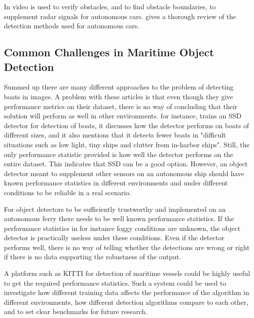 \vspace{3mm}

\noindent
In \citep{Wedel2007} video is used to verify obstacles, and to find obstacle boundaries, to supplement radar signals for autonomous cars. \citep{Sun2006} gives a thorough review of the detection methods used for autonomous cars. 


\subsection{Common Challenges in Maritime Object Detection}
Summed up there are many different approaches to the problem of detecting boats in images. A problem with these articles is that even though they give performance metrics on their dataset, there is no way of concluding that their solution will perform as well in other environments. \citep{SSD_detection2018} for instance, trains an SSD detector for detection of boats, it discusses how the detector performs on boats of different sizes, and it also mentions that it detects fewer boats in "difficult situations such as low light, tiny ships and clutter from in-harbor ships". Still, the only performance statistic provided is how well the detector performs on the entire dataset. This indicates that SSD can be a good option. However, an object detector meant to supplement other sensors on an autonomous ship should have known performance statistics in different environments and under different conditions to be reliable in a real scenario. 

\vspace{3mm}

For object detectors to be sufficiently trustworthy and implemented on an autonomous ferry there needs to be well known performance statistics. If the performance statistics in for instance foggy conditions are unknown, the object detector is practically useless under these conditions. Even if the detector performs well, there is no way of telling whether the detections are wrong or right if there is no data supporting the robustness of the output.

\vspace{3mm}

A platform such as KITTI \citep{KITTI} for detection of maritime vessels could be highly useful to get the required performance statistics. Such a system could be used to investigate how different training data affects the performance of the algorithm in different environments, how different detection algorithms compare to each other, and to set clear benchmarks for future research.



\cleardoublepage